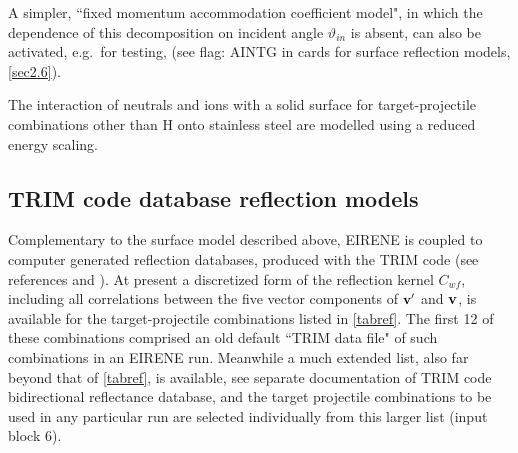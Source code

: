 A simpler, ``fixed momentum accommodation coefficient model", in which the
dependence of this decomposition on incident angle $\vartheta_{in} $ is absent,
can also be activated, e.g.\  for testing, (see flag: AINTG in cards for
surface reflection models, \cref{sec2.6}).

The interaction of neutrals and ions with a solid surface for target-projectile
combinations other than H onto stainless steel are modelled using a reduced
energy scaling.

\subsection{TRIM code database reflection models} \label{sec1.3.2}

Complementary to the surface model described above, EIRENE is coupled to
computer generated reflection databases, produced with the TRIM code (see
references \cite{kn:Eckstein} and \cite{kn:Bateman}).
At present a discretized form of the reflection kernel $C_{wf}$, including all
correlations between the five vector components of $ \mathbf{v} '$ and $\mathbf{v} $, is
available for the target-projectile combinations listed in \cref{tabref}.
The first 12 of these combinations comprised an old default ``TRIM data file"
of such combinations in an EIRENE run.
Meanwhile a much extended list, also far beyond that of \cref{tabref}, is
available, see separate documentation of TRIM code bidirectional reflectance
database, and the target projectile combinations to be used in any particular
run are selected individually from this larger list (input block 6).

